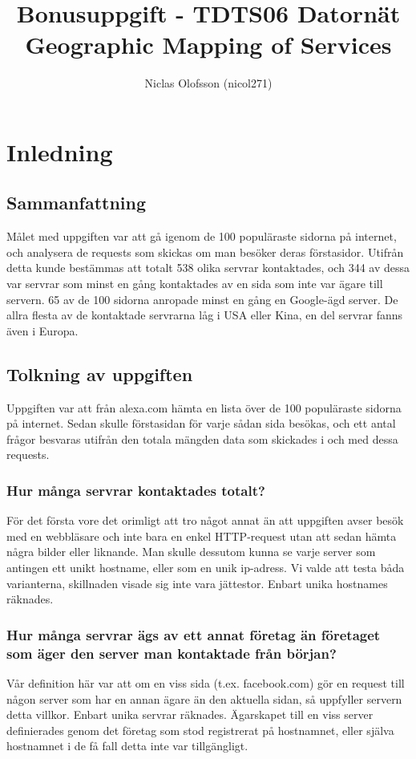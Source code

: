 \documentclass[a4paper]{article}
\title{
Bonusuppgift - TDTS06 Datornät\\
Geographic Mapping of Services\\
}
\author{
Niclas Olofsson (nicol271)\\
}
\begin{document}
\providecommand{\abs}[1]{\vert#1\vert}
\setlength{\parindent}{0pt}

\maketitle

\section{Inledning}
\subsection{Sammanfattning}
Målet med uppgiften var att gå igenom de 100 populäraste sidorna på internet, och analysera de requests som skickas om man besöker deras förstasidor. Utifrån detta kunde bestämmas att totalt 538 olika servrar kontaktades, och 344 av dessa var servrar som minst en gång kontaktades av en sida som inte var ägare till servern. 65 av de 100 sidorna anropade minst en gång en Google-ägd server. De allra flesta av de kontaktade servrarna låg i USA eller Kina, en del servrar fanns även i Europa.

\subsection{Tolkning av uppgiften}
Uppgiften var att från alexa.com hämta en lista över de 100 populäraste sidorna på internet. Sedan skulle förstasidan för varje sådan sida besökas, och ett antal frågor besvaras utifrån den totala mängden data som skickades i och med dessa requests.\\

\subsubsection{Hur många servrar kontaktades totalt?}
För det första vore det orimligt att tro något annat än att uppgiften avser besök med en webbläsare och inte bara en enkel HTTP-request utan att sedan hämta några bilder eller liknande. Man skulle dessutom kunna se varje server som antingen ett unikt hostname, eller som en unik ip-adress. Vi valde att testa båda varianterna, skillnaden visade sig inte vara jättestor. Enbart unika hostnames räknades.\\

\subsubsection{Hur många servrar ägs av ett annat företag än företaget som äger den server man kontaktade från början?}
Vår definition här var att om en viss sida (t.ex. facebook.com) gör en request till någon server som har en annan ägare än den aktuella sidan, så uppfyller servern detta villkor. Enbart unika servrar räknades. Ägarskapet till en viss server definierades genom det företag som stod registrerat på hostnamnet, eller själva hostnamnet i de få fall detta inte var tillgängligt.\\
\end{document}
